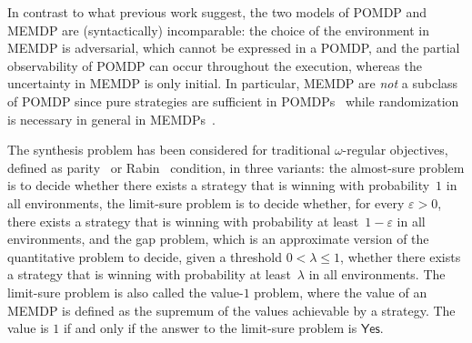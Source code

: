 \documentclass[a4paper,USenglish,cleveref, autoref, thm-restate]{lipics-v2021}
\let\epsilon\varepsilon
\begin{document}
In contrast to what previous work suggest, the two models of POMDP and MEMDP
are (syntactically) incomparable: the choice of the environment in MEMDP is 
adversarial, which cannot be expressed in a POMDP, and the partial observability 
of POMDP can occur throughout the execution, whereas the uncertainty in MEMDP 
is only initial. In particular, MEMDP are \emph{not} a subclass of POMDP
since pure strategies are sufficient in POMDPs~\cite{Mar98,CDGH15} while 
randomization is necessary in general in MEMDPs~\cite[Lemma~3]{RS14}.

The synthesis problem has been considered for traditional $\omega$-regular
objectives, defined as parity~\cite{RS14} or Rabin~\cite{SVJ24} condition,
in three variants: the almost-sure problem is to decide whether there exists a strategy 
that is winning with probability~$1$ in all environments, the limit-sure
problem is to decide whether, for every $\epsilon > 0$, there exists a strategy 
that is winning with probability at least~$1-\epsilon$ in all environments,
and the gap problem, which is an approximate version of the quantitative problem to decide, given a threshold $0 < \lambda \leq 1$,
whether there exists a strategy 
that is winning with probability at least~$\lambda$ in all environments. 
The limit-sure problem is also called the value-$1$ problem, 
where the value of an MEMDP is defined as the supremum of the values
achievable by a strategy. The value is $1$ if and only if the answer to 
the limit-sure problem is $\textsf{Yes}$.
\end{document}
